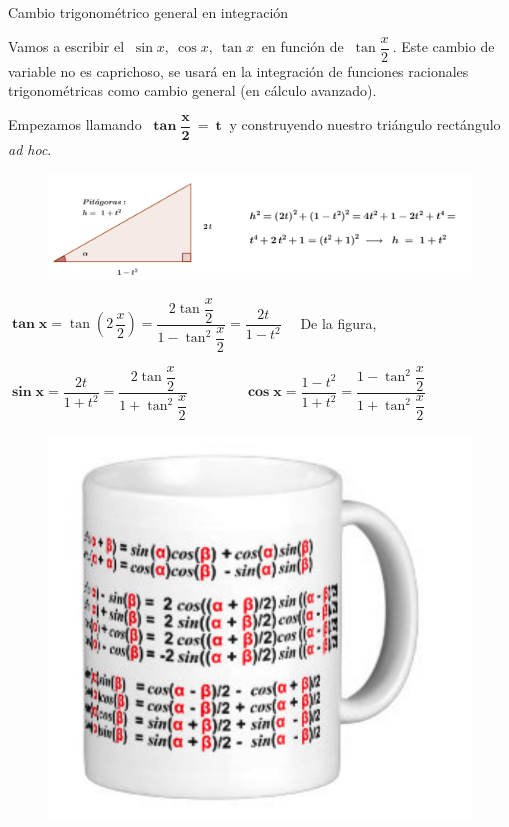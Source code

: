 \vspace{5mm}
\begin{myalertblock}{Cambio trigonométrico general en integración}

Vamos a escribir el $\ \sin x,\ \cos x,\ \tan x\ $	en función de $\ \tan \dfrac x 2\ $. Este cambio de variable no es caprichoso, se usará en la integración de funciones racionales trigonométricas como cambio general (en cálculo avanzado).

\vspace{2mm}Empezamos llamando $\ \boldsymbol{\tan \dfrac x 2 \ = \ t } \ $ y construyendo nuestro triángulo rectángulo \emph{ad hoc}.

\begin{figure}[H]
	\centering
	\includegraphics[width=.95\textwidth]{img-ft/ft08.png}
	\end{figure}
	
\hspace{2cm} \vspace{2mm} $\boldsymbol{ \tan x} = \tan \left( 2 \, \dfrac x 2 \right) = \dfrac{2 \tan \dfrac x 2}{1-\tan^2 \dfrac x 2} = \dfrac{2t}{1-t^2}\quad $ De la figura, 

\hspace{2cm} \vspace{2mm} $\boldsymbol{ \sin x} = \dfrac{2t}{1+t^2}=\dfrac{2 \tan \dfrac x 2}{1+\tan^2 \dfrac x 2} \qquad \qquad \boldsymbol{\cos x}=\dfrac{1-t^2}{1+t^2}=\dfrac{1-\tan^2 \dfrac x 2}{1+\tan^2 \dfrac x 2}$ 
\end{myalertblock}

\begin{figure}[H]
	\centering
	\includegraphics[width=.6\textwidth]{img-ft/ft04.png}
	\end{figure}
	
